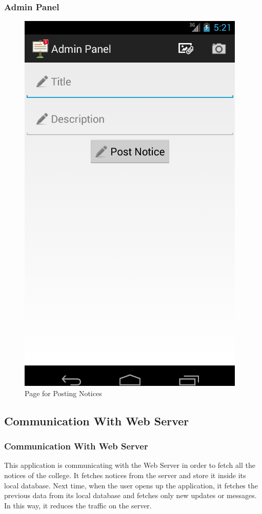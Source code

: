 \documentclass{beamer}   %
\begin{document}
\begin{frame}
\frametitle{Admin Panel}
\begin{figure}
\includegraphics[scale=0.2]{image/post.png}
\caption{Page for Posting Notices}
\end{figure}
\end{frame}

\subsection{Communication With Web Server}
\begin{frame}
\frametitle{Communication With Web Server}
This application is communicating with the Web Server in order to fetch all the notices of the college. It fetches notices from the server
and store it inside its local database. Next time, when the user opens up the application, it fetches the previous data from its local database and fetches only new updates or messages. In this way, it reduces the traffic on the server.

\end{frame}
\end{document}
